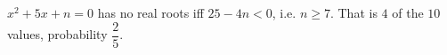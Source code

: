 $x^2+5x+n=0$ has no real roots iff $25-4n<0$, i.e. $n\ge7$. That is $4$ of the $10$ values, probability $\boxed{\dfrac25}$.
